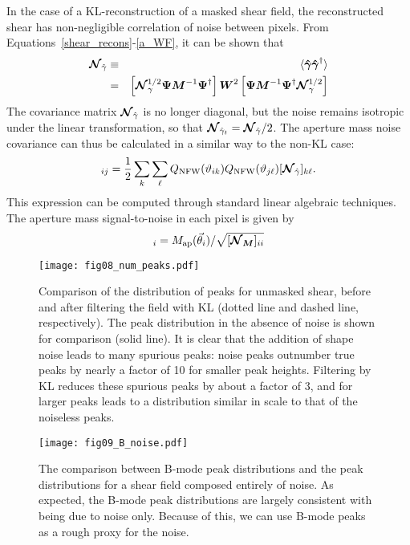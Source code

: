 In the case of a KL-reconstruction of a masked shear field, the reconstructed
shear has non-negligible correlation of noise between pixels.  
From Equations~\ref{shear_recons}-\ref{a_WF}, it can be shown that
\begin{eqnarray}
  \boldsymbol{\mathcal{N}}_{\hat\gamma} 
  & \equiv  &
  \langle\boldsymbol{\hat\gamma} \boldsymbol{\hat\gamma}^\dagger\rangle\nonumber\\
  & = & \left[\boldsymbol{\mathcal{N}}_\gamma^{1/2}\boldsymbol{\Psi} \boldsymbol{M}^{-1} \boldsymbol{\Psi}^\dagger\right]
  \boldsymbol{W}^2 
  \left[\boldsymbol{\Psi} \boldsymbol{M}^{-1} \boldsymbol{\Psi}^\dagger \boldsymbol{\mathcal{N}}_\gamma^{1/2}\right]
\end{eqnarray}
The covariance matrix $\boldsymbol{\mathcal{N}}_{\hat\gamma}$ is no longer diagonal, but
the noise remains isotropic under the linear transformation, so that
$\boldsymbol{\mathcal{N}}_{\hat{\gamma}_t} = \boldsymbol{\mathcal{N}}_{\hat{\gamma}}/2$.
The aperture mass noise covariance can thus be calculated in a similar 
way to the non-KL case:
\begin{equation}
  [\Noise_M]_{ij} = \frac{1}{2}\sum_k\sum_\ell Q_{\rm NFW}(\vartheta_{ik})
  Q_{\rm NFW}(\vartheta_{j\ell}) [\Noise_{\hat\gamma}]_{k\ell}.
\end{equation}
This expression can be computed through standard linear algebraic techniques.  
The aperture mass signal-to-noise in each pixel is given by 
\begin{equation}
  [S/N]_i = M_{\rm ap}(\vec\theta_i)/\sqrt{[\mymat{\Noise_M}]_{ii}}
\end{equation}

\begin{figure}
 \centering
 \texttt{[image: fig08\_num\_peaks.pdf]}
 \caption{
   Comparison of the distribution of \Map peaks for unmasked shear,
   before and after filtering
   the field with KL (dotted line and dashed line, respectively).  The
   peak distribution in the absence of noise is shown for comparison
   (solid line).  It is clear that the addition of shape noise leads to 
   many spurious \Map peaks: noise peaks outnumber true peaks by nearly a
   factor of 10 for smaller peak heights.  Filtering by KL reduces these
   spurious peaks by about a factor of 3, and for larger peaks leads
   to a distribution similar in scale to that of the noiseless peaks.
   \label{fig_num_peaks}  
 } 
\end{figure}

\begin{figure}
 \centering
 \texttt{[image: fig09\_B\_noise.pdf]}
 \caption{The comparison between B-mode peak distributions and the
   peak distributions for a shear field composed entirely of noise.
   As expected, the B-mode peak distributions are largely consistent
   with being due to noise only.  Because of this, we can use B-mode
   peaks as a rough proxy for the noise.
   \label{fig_B_noise} 
 }
\end{figure}

